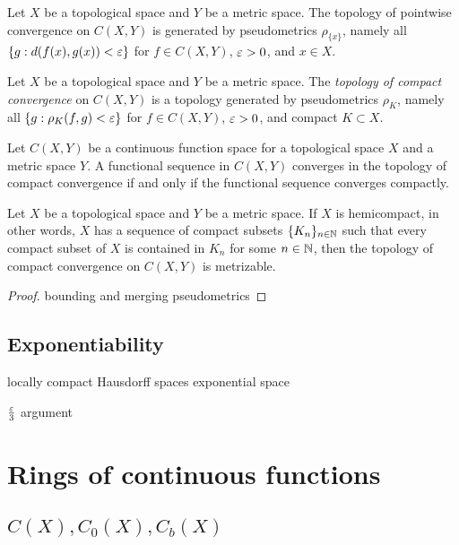 \documentclass{../crs}
\begin{document}
\begin{prop}
Let $X$ be a topological space and $Y$ be a metric space.
The topology of pointwise convergence on $C(X,Y)$ is generated by pseudometrics $\rho_{\{x\}}$, namely all $\{g:d(f(x),g(x))<\varepsilon\}$ for $f\in C(X,Y)$, $\varepsilon>0$, and $x\in X$.
\end{prop}

\begin{defn}
Let $X$ be a topological space and $Y$ be a metric space.
The \emph{topology of compact convergence} on $C(X,Y)$ is a topology generated by pseudometrics $\rho_K$, namely all $\{g:\rho_K(f,g)<\varepsilon\}$ for $f\in C(X,Y)$, $\varepsilon>0$, and compact $K\subset X$.
\end{defn}

\begin{prop}
Let $C(X,Y)$ be a continuous function space for a topological space $X$ and a metric space $Y$.
A functional sequence in $C(X,Y)$ converges in the topology of compact convergence if and only if the functional sequence converges compactly.
\end{prop}

\begin{thm}
Let $X$ be a topological space and $Y$ be a metric space.
If $X$ is hemicompact, in other words, $X$ has a sequence of compact subsets $\{K_n\}_{n\in\mathbb{N}}$ such that every compact subset of $X$ is contained in $K_n$ for some $n\in\mathbb{N}$, then the topology of compact convergence on $C(X,Y)$ is metrizable.
\end{thm}

\begin{proof}
bounding and merging pseudometrics
\end{proof}



\subsection{Exponentiability}
locally compact Hausdorff spaces
exponential space






$\frac{\varepsilon}3$ argument





\section{Rings of continuous functions}
\subsection{$C(X), C_0(X), C_b(X)$}
\end{document}
